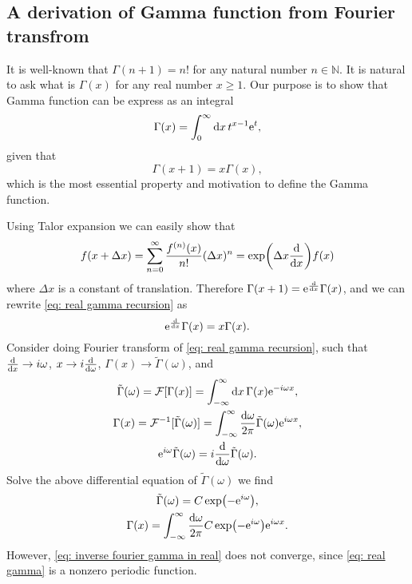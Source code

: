 \documentclass[10pt]{article}
\begin{document}
	\subsection{A derivation of Gamma function from Fourier transfrom}

	It is well-known that $\Gamma(n+1) = n!$ for any natural number $n \in \mathbb{N}$. It is natural to ask what is $\Gamma(x)$ for any real number $x \ge 1$. Our purpose is to show that Gamma function can be express as an integral
	\begin{equation}
		\Gamma(x) = \int_0^{\infty} \dd{x} t^{x-1} {\mathrm{e}}^t, \label{eq: gamma integral}
	\end{equation}
	given that
	\begin{equation}
		\Gamma(x+1) = x \Gamma(x), \label{eq: gamma recursion}
	\end{equation}
	which is the most essential property and motivation to define the Gamma function.

	Using Talor expansion we can easily show that
	\begin{equation}
		f(x + \Delta x) = \sum_{n=0}^{\infty} \frac{f^{(n)}(x)}{n!} (\Delta x)^n = \exp(\Delta x \dv{x}) f(x)
	\end{equation}
	where $\Delta x$ is a constant of translation. Therefore $\Gamma(x + 1) = {\mathrm{e}}^{\dv{x}} \Gamma(x)$, and we can rewrite \eqref{eq: real gamma recursion} as
	\begin{equation}
		{\mathrm{e}}^{\dv{x}} \Gamma(x) = x \Gamma(x). \label{eq: real gamma recursion}
	\end{equation}
	Consider doing Fourier transform of \eqref{eq: real gamma recursion}, such that $\dv{x} \to i \omega$, $x \to i \dv{\omega}$, $\Gamma(x) \to \tilde{\Gamma}(\omega)$, and
	\begin{gather}
		\tilde{\Gamma}(\omega) = \mathcal{F}[\Gamma(x)] = \int_{-\infty}^{\infty} \dd{x} \Gamma(x) {\mathrm{e}}^{-i \omega x}, \\
		\Gamma(x) = \mathcal{F}^{-1}[\tilde{\Gamma}(\omega)] = \int_{-\infty}^{\infty} \frac{\dd{\omega}}{2 \pi} \tilde{\Gamma}(\omega) {\mathrm{e}}^{i \omega x}, \\
		{\mathrm{e}}^{i \omega} \tilde{\Gamma}(\omega) = i \dv{\omega} \tilde{\Gamma}(\omega).
	\end{gather}
	Solve the above differential equation of $\tilde{\Gamma}(\omega)$ we find
	\begin{gather}
		\tilde{\Gamma}(\omega) = C \exp(- {\mathrm{e}}^{i \omega}), \label{eq: real gamma} \\
		\Gamma(x) = \int_{-\infty}^{\infty}  \frac{\dd{\omega}}{2 \pi} C \exp(- {\mathrm{e}}^{i \omega}) {\mathrm{e}}^{i \omega x}. \label{eq: inverse fourier gamma in real}
	\end{gather}
	However, \eqref{eq: inverse fourier gamma in real} does not converge, since \eqref{eq: real gamma} is a nonzero periodic function.
\end{document}
